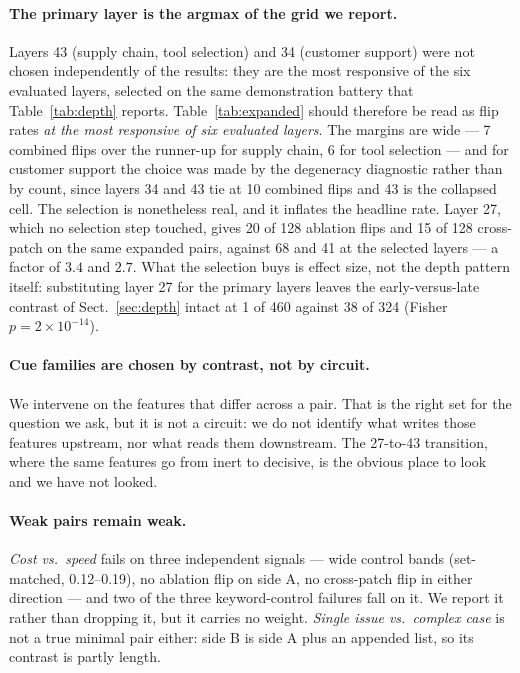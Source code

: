 \documentclass{article}
\begin{document}
\paragraph{The primary layer is the argmax of the grid we report.} Layers 43 (supply chain, tool selection) and 34 (customer support) were not chosen independently of the results: they are the most responsive of the six evaluated layers, selected on the same demonstration battery that Table~\ref{tab:depth} reports. Table~\ref{tab:expanded} should therefore be read as flip rates \emph{at the most responsive of six evaluated layers}. The margins are wide --- 7 combined flips over the runner-up for supply chain, 6 for tool selection --- and for customer support the choice was made by the degeneracy diagnostic rather than by count, since layers 34 and 43 tie at 10 combined flips and 43 is the collapsed cell. The selection is nonetheless real, and it inflates the headline rate. Layer 27, which no selection step touched, gives 20 of 128 ablation flips and 15 of 128 cross-patch on the same expanded pairs, against 68 and 41 at the selected layers --- a factor of $3.4$ and $2.7$. What the selection buys is effect size, not the depth pattern itself: substituting layer 27 for the primary layers leaves the early-versus-late contrast of Sect.~\ref{sec:depth} intact at 1 of 460 against 38 of 324 (Fisher $p = 2 \times 10^{-14}$).

\paragraph{Cue families are chosen by contrast, not by circuit.} We intervene on the features that differ across a pair. That is the right set for the question we ask, but it is not a circuit: we do not identify what writes those features upstream, nor what reads them downstream. The 27-to-43 transition, where the same features go from inert to decisive, is the obvious place to look and we have not looked.

\paragraph{Weak pairs remain weak.} \emph{Cost vs.\ speed} fails on three independent signals --- wide control bands (set-matched, 0.12--0.19), no ablation flip on side A, no cross-patch flip in either direction --- and two of the three keyword-control failures fall on it. We report it rather than dropping it, but it carries no weight. \emph{Single issue vs.\ complex case} is not a true minimal pair either: side B is side A plus an appended list, so its contrast is partly length.
\end{document}
